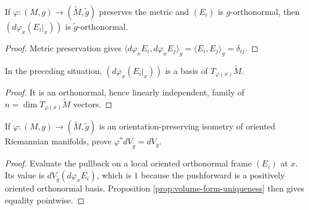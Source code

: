 \begin{lemma}
\label{lem:orthonormal-pushforward}
\leanok
{}
If $\varphi:(M,g)\to(\widetilde M,\widetilde g)$ preserves the metric and $(E_i)$ is $g$-orthonormal, then $(d\varphi_x(E_i|_x))$ is $\widetilde g$-orthonormal.
\end{lemma}

\begin{proof}
\leanok
{}
\sketch Metric preservation gives $\langle d\varphi_xE_i,d\varphi_xE_j\rangle_{\widetilde g}=\langle E_i,E_j\rangle_g=\delta_{ij}$.
\end{proof}

\begin{lemma}
\label{lem:push-basis}
\leanok
{}
In the preceding situation, $(d\varphi_x(E_i|_x))$ is a basis of $T_{\varphi(x)}\widetilde M$.
\end{lemma}

\begin{proof}
\leanok
{}
\sketch It is an orthonormal, hence linearly independent, family of $n=\dim T_{\varphi(x)}\widetilde M$ vectors.
\end{proof}

\begin{exercise}\label{exer:isometry-preserves-volume-form}
\leanok
{}
If $\varphi:(M,g)\to(\widetilde M,\widetilde g)$ is an orientation-preserving isometry of oriented Riemannian manifolds, prove $\varphi^*dV_{\widetilde g}=dV_g$.
\end{exercise}

\begin{proof}
\leanok
{}
\sketch Evaluate the pullback on a local oriented orthonormal frame $(E_i)$ at $x$. Its value is $dV_{\widetilde g}(d\varphi_xE_i)$, which is $1$ because the pushforward is a positively oriented orthonormal basis. Proposition \ref{prop:volume-form-uniqueness} then gives equality pointwise.
\end{proof}

